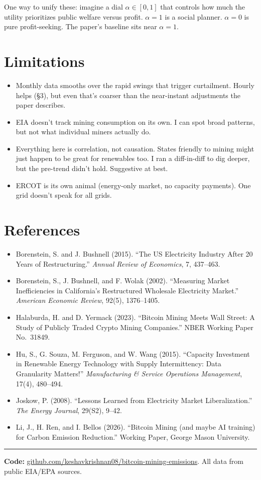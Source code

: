 \documentclass[11pt, letterpaper]{article}
\begin{document}
One way to unify these: imagine a dial $\alpha \in [0,1]$ that controls how much the utility prioritizes public welfare versus profit. $\alpha = 1$ is a social planner. $\alpha = 0$ is pure profit-seeking. The paper's baseline sits near $\alpha = 1$.


\section{Limitations}

\begin{itemize}
\item Monthly data smooths over the rapid swings that trigger curtailment. Hourly helps (\S3), but even that's coarser than the near-instant adjustments the paper describes.
\item EIA doesn't track mining consumption on its own. I can spot broad patterns, but not what individual miners actually do.
\item Everything here is correlation, not causation. States friendly to mining might just happen to be great for renewables too. I ran a diff-in-diff to dig deeper, but the pre-trend didn't hold. Suggestive at best.
\item ERCOT is its own animal (energy-only market, no capacity payments). One grid doesn't speak for all grids.
\end{itemize}


\section{References}
\small
\begin{itemize}[nosep, leftmargin=1.2em, itemsep=3pt]
\item Borenstein, S. and J. Bushnell (2015). ``The US Electricity Industry After 20 Years of Restructuring.'' \textit{Annual Review of Economics}, 7, 437--463.
\item Borenstein, S., J. Bushnell, and F. Wolak (2002). ``Measuring Market Inefficiencies in California's Restructured Wholesale Electricity Market.'' \textit{American Economic Review}, 92(5), 1376--1405.
\item Halaburda, H. and D. Yermack (2023). ``Bitcoin Mining Meets Wall Street: A Study of Publicly Traded Crypto Mining Companies.'' NBER Working Paper No.\ 31849.
\item Hu, S., G. Souza, M. Ferguson, and W. Wang (2015). ``Capacity Investment in Renewable Energy Technology with Supply Intermittency: Data Granularity Matters!'' \textit{Manufacturing \& Service Operations Management}, 17(4), 480--494.
\item Joskow, P. (2008). ``Lessons Learned from Electricity Market Liberalization.'' \textit{The Energy Journal}, 29(S2), 9--42.
\item Li, J., H. Ren, and I. Bellos (2026). ``Bitcoin Mining (and maybe AI training) for Carbon Emission Reduction.'' Working Paper, George Mason University.
\end{itemize}
\normalsize

\vspace{6pt}
\hrule
\vspace{4pt}
{\small\noindent\textbf{Code:} \href{https://github.com/keshavkrishnan08/bitcoin-mining-emissions}{github.com/keshavkrishnan08/bitcoin-mining-emissions}. All data from public EIA/EPA sources.}
\end{document}
